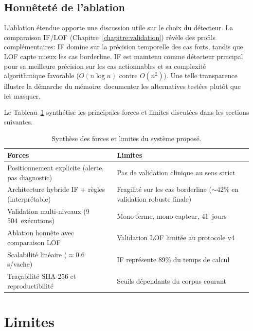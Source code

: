 \subsection{Honnêteté de l'ablation}
L'ablation étendue apporte une discussion utile sur le choix du détecteur. La comparaison
IF/LOF (Chapitre~\ref{chapitre:validation}) révèle des profils complémentaires: IF domine
sur la précision temporelle des cas forts, tandis que LOF capte mieux les cas borderline.
IF est maintenu comme détecteur principal pour sa meilleure précision sur les cas
actionnables et sa complexité algorithmique favorable ($O(n \log n)$ contre $O(n^2)$).
Une telle transparence illustre la démarche du mémoire: documenter les alternatives testées
plutôt que les masquer.

Le Tableau~\ref{tab:forces_limites} synthétise les principales forces et limites discutées
dans les sections suivantes.

\begin{table}[H]
    \centering
    \caption{Synthèse des forces et limites du système proposé.}
    \label{tab:forces_limites}
    \begin{tabular}{p{6.5cm}p{6.5cm}}
        \toprule
        \textbf{Forces} & \textbf{Limites} \\
        \midrule
        Positionnement explicite (alerte, pas diagnostic) &
            Pas de validation clinique au sens strict \\
        Architecture hybride IF + règles (interprétable) &
            Fragilité sur les cas borderline ($\sim$42\% en validation robuste finale) \\
        Validation multi-niveaux (9\,504~exécutions) &
            Mono-ferme, mono-capteur, 41~jours \\
        Ablation honnête avec comparaison LOF &
            Validation LOF limitée au protocole v4 \\
        Scalabilité linéaire ($\approx$0.6\,s/vache) &
            IF représente 89\% du temps de calcul \\
        Traçabilité SHA-256 et reproductibilité &
            Seuils dépendants du corpus courant \\
        \bottomrule
    \end{tabular}
\end{table}

\FloatBarrier
\section{Limites}

